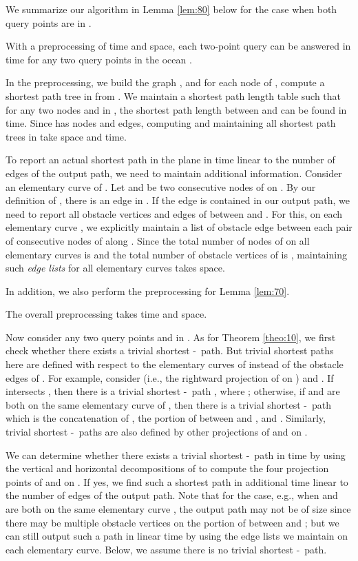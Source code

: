 \documentclass[english,runningheads,11pt]{llncs}
\def\st{-}
\newenvironment{proof}{\noindent {\textbf{Proof:}}\rm}{\hfill \rm}
\begin{document}
We summarize our algorithm in Lemma
\ref{lem:80} below for the case when both query points are in .

\begin{lemma}\label{lem:80}
With a preprocessing of  time and
 space,
each two-point query can be answered in 
time for any two query points in the ocean .
\end{lemma}
\begin{proof}
In the preprocessing, we build the graph , and for each node
 of , compute a shortest path tree in 
from . We maintain a shortest path length table such that for
any two nodes  and  in , the shortest path length
between  and  can  be found in  time. Since
 has  nodes and edges, computing and maintaining
all shortest path trees in  take  space and
 time.


To report an actual shortest path in the plane in time linear to the number of edges of
the output path, we need to maintain additional information. Consider an elementary curve
 of . Let  and  be two consecutive nodes of  on .
By our definition of , there is an edge 
in . If the edge  is contained in our output path, we
need to report all obstacle vertices and edges of  between  and
. For this, on each elementary curve , we explicitly
maintain a list of obstacle edge between each pair of consecutive nodes of
 along . Since the total number of nodes of 
on all elementary curves is  and the total number of obstacle
vertices of  is , maintaining such {\em edge lists} for
all elementary curves takes  space.

In addition, we also perform the preprocessing for Lemma \ref{lem:70}.

The overall preprocessing takes  time and
 space.


Now consider any two query points  and  in . As
for Theorem \ref{theo:10}, we first check whether there
exists a trivial shortest \st\ path. But trivial shortest paths
here are defined with respect to the elementary curves of  instead of the obstacle
edges of . For example, consider  (i.e., the rightward projection of
 on ) and . If 
intersects , then there is a trivial shortest \st\
path , where ; otherwise, if  and  are both on the same
elementary curve  of , then there is a trivial shortest
\st\ path which is the concatenation of , the
portion of  between  and , and .
Similarly, trivial shortest \st\ paths are also defined by other
projections of  and  on .

We can determine whether there exists a trivial shortest \st\ path in
 time by using the vertical and horizontal decompositions of
 to compute the four projection points of  and
 on . If yes, we find such a shortest path in
additional time linear to the number of edges of the output path. Note
that for the case, e.g., when  and  are both on the same elementary curve
, the output path may not be of  size since there
may be multiple obstacle vertices on the portion of  between 
and ; but we can still output such a path in linear time by using the
edge lists we maintain on each elementary curve.
Below, we assume there is no trivial shortest \st\ path.


\end{proof}
\end{document}
